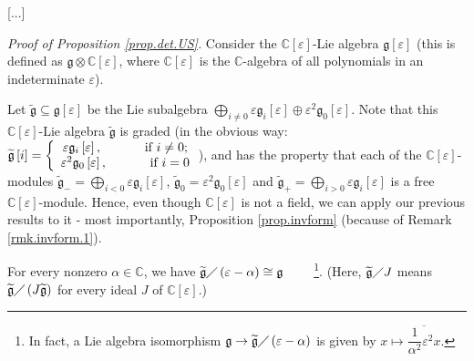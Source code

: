 \documentclass
[numbers=enddot,12pt,final,onecolumn,german,notitlepage]{scrartcl}%
\theoremstyle{definition}
\begin{document}
[...]

\textit{Proof of Proposition \ref{prop.det.US}.} Consider the $\mathbb{C}%
\left[  \varepsilon\right]  $-Lie algebra $\mathfrak{g}\left[  \varepsilon
\right]  $ (this is defined as $\mathfrak{g}\otimes\mathbb{C}\left[
\varepsilon\right]  $, where $\mathbb{C}\left[  \varepsilon\right]  $ is the
$\mathbb{C}$-algebra of all polynomials in an indeterminate $\varepsilon$).

Let $\widetilde{\mathfrak{g}}\subseteq\mathfrak{g}\left[  \varepsilon\right]
$ be the Lie subalgebra $\bigoplus\limits_{i\neq0}\varepsilon\mathfrak{g}%
_{i}\left[  \varepsilon\right]  \oplus\varepsilon^{2}\mathfrak{g}_{0}\left[
\varepsilon\right]  $. Note that this $\mathbb{C}\left[  \varepsilon\right]
$-Lie algebra $\widetilde{\mathfrak{g}}$ is graded (in the obvious way:
$\widetilde{\mathfrak{g}}\left[  i\right]  =\left\{
\begin{array}
[c]{c}%
\varepsilon\mathfrak{g}_{i}\left[  \varepsilon\right]
,\ \ \ \ \ \ \ \ \ \ \text{if }i\neq0;\\
\varepsilon^{2}\mathfrak{g}_{0}\left[  \varepsilon\right]
,\ \ \ \ \ \ \ \ \ \ \text{if }i=0
\end{array}
\right.  $), and has the property that each of the $\mathbb{C}\left[
\varepsilon\right]  $-modules $\widetilde{\mathfrak{g}}_{-}=\bigoplus
\limits_{i<0}\varepsilon\mathfrak{g}_{i}\left[  \varepsilon\right]  $,
$\widetilde{\mathfrak{g}}_{0}=\varepsilon^{2}\mathfrak{g}_{0}\left[
\varepsilon\right]  $ and $\widetilde{\mathfrak{g}}_{+}=\bigoplus
\limits_{i>0}\varepsilon\mathfrak{g}_{i}\left[  \varepsilon\right]  $ is a
free $\mathbb{C}\left[  \varepsilon\right]  $-module. Hence, even though
$\mathbb{C}\left[  \varepsilon\right]  $ is not a field, we can apply our
previous results to it - most importantly, Proposition \ref{prop.invform}
(because of Remark \ref{rmk.invform.1}).

For every nonzero $\alpha\in\mathbb{C}$, we have $\widetilde{\mathfrak{g}%
}\diagup\left(  \varepsilon-\alpha\right)  \cong\mathfrak{g}$%
\ \ \ \ \footnote{In fact, a Lie algebra isomorphism $\mathfrak{g}%
\rightarrow\widetilde{\mathfrak{g}}\diagup\left(  \varepsilon-\alpha\right)  $
is given by $x\mapsto\overline{\dfrac{1}{\alpha^{2}}\varepsilon^{2}x}$.}.
(Here, $\widetilde{\mathfrak{g}}\diagup J$ means $\widetilde{\mathfrak{g}%
}\diagup\left(  J\widetilde{\mathfrak{g}}\right)  $ for every ideal $J$ of
$\mathbb{C}\left[  \varepsilon\right]  $.)
\end{document}
